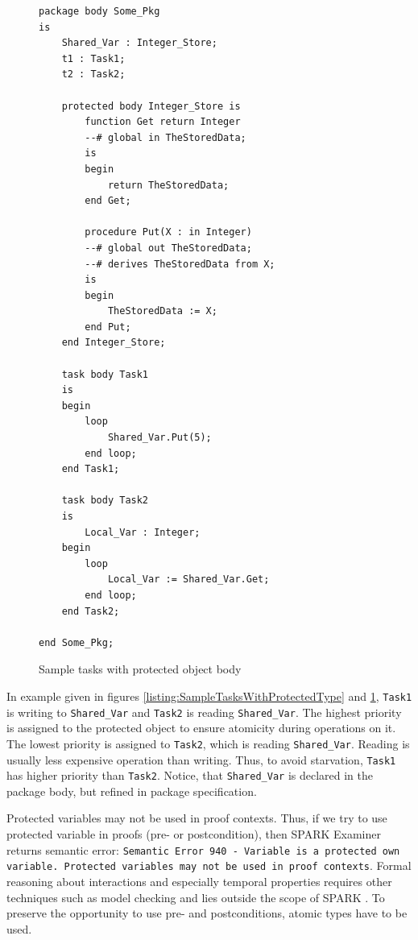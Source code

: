\begin{figure}[ht]
\singlespacing
\begin{lstlisting}[frame=single, gobble=0]
package body Some_Pkg
is
    Shared_Var : Integer_Store;
    t1 : Task1;
    t2 : Task2;

    protected body Integer_Store is
        function Get return Integer
        --# global in TheStoredData;
        is
        begin
            return TheStoredData;
        end Get;

        procedure Put(X : in Integer)
        --# global out TheStoredData;
        --# derives TheStoredData from X;
        is
        begin
            TheStoredData := X;
        end Put;
    end Integer_Store;

    task body Task1
    is
    begin
        loop
            Shared_Var.Put(5);
        end loop;
    end Task1;

    task body Task2
    is
        Local_Var : Integer;
    begin
        loop
            Local_Var := Shared_Var.Get;
        end loop;
    end Task2;

end Some_Pkg;
\end{lstlisting} 
\doublespacing
\caption{Sample tasks with protected object body}
\label{listing:SampleTasksWithProtectedTypeBody}
\end{figure}

In example given in figures \ref{listing:SampleTasksWithProtectedType} and \ref{listing:SampleTasksWithProtectedTypeBody}, \lstinline{Task1} is writing to \lstinline{Shared_Var} and \lstinline{Task2} is reading \lstinline{Shared_Var}. The highest priority is assigned to the protected object to ensure atomicity during operations on it. The lowest priority is assigned to \lstinline{Task2}, which is reading \lstinline{Shared_Var}. Reading is usually less expensive operation than writing. Thus, to avoid starvation, \lstinline{Task1} has higher priority than \lstinline{Task2}. Notice, that \lstinline{Shared_Var} is declared in the package body, but refined in package specification.

Protected variables may not be used in proof contexts. Thus, if we try to use protected variable in proofs (pre- or postcondition), then SPARK Examiner returns semantic error: \lstinline{Semantic Error 940 - Variable is a protected own variable. Protected variables may not be used in proof contexts}. Formal reasoning about interactions and especially temporal properties requires other techniques such as model checking and lies outside the scope of SPARK \cite{Barnes:Book}. To preserve the opportunity to use pre- and postconditions, atomic types have to be used.

